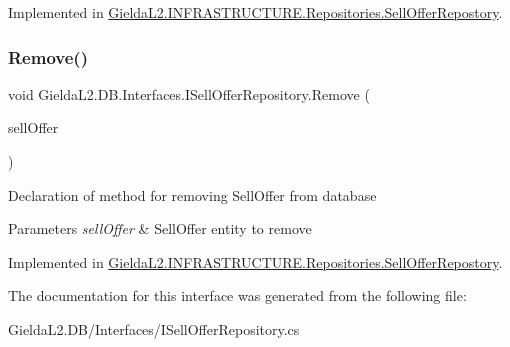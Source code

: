 Implemented in \mbox{\hyperlink{class_gielda_l2_1_1_i_n_f_r_a_s_t_r_u_c_t_u_r_e_1_1_repositories_1_1_sell_offer_repostory_a66ee116572e1e4c959b50d3ad1c4698d}{Gielda\+L2.\+I\+N\+F\+R\+A\+S\+T\+R\+U\+C\+T\+U\+R\+E.\+Repositories.\+Sell\+Offer\+Repostory}}.

\mbox{\label{interface_gielda_l2_1_1_d_b_1_1_interfaces_1_1_i_sell_offer_repository_ab77d59db7295ed7a3c7457f8cc0d84d2}} 
\subsubsection{\texorpdfstring{Remove()}{Remove()}}
{\footnotesize\ttfamily void Gielda\+L2.\+D\+B.\+Interfaces.\+I\+Sell\+Offer\+Repository.\+Remove (\begin{DoxyParamCaption}\item[{\mbox{\hyperlink{class_gielda_l2_1_1_d_b_1_1_entities_1_1_sell_offer}{Sell\+Offer}}}]{sell\+Offer }\end{DoxyParamCaption})}



Declaration of method for removing Sell\+Offer from database 


\begin{DoxyParams}{Parameters}
{\em sell\+Offer} & Sell\+Offer entity to remove\\
\hline
\end{DoxyParams}


Implemented in \mbox{\hyperlink{class_gielda_l2_1_1_i_n_f_r_a_s_t_r_u_c_t_u_r_e_1_1_repositories_1_1_sell_offer_repostory_ad66a43f51403182c2c341f8fcfc77715}{Gielda\+L2.\+I\+N\+F\+R\+A\+S\+T\+R\+U\+C\+T\+U\+R\+E.\+Repositories.\+Sell\+Offer\+Repostory}}.



The documentation for this interface was generated from the following file\+:\begin{DoxyCompactItemize}
\item 
Gielda\+L2.\+D\+B/\+Interfaces/I\+Sell\+Offer\+Repository.\+cs\end{DoxyCompactItemize}
